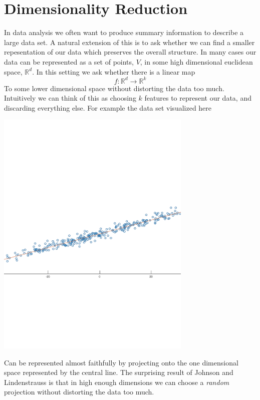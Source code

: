 \documentclass[11pt]{article}
\newcommand{\arr}{\rightarrow}
\newcommand{\R}{\mathbb{R}}
\begin{document}
\section{Dimensionality Reduction}
In data analysis we often want to produce summary information to describe a large data set. A natural extension of this is to ask whether we can find a smaller repesentation of our data which preserves the overall structure. In many cases our data can be represented as a set of points, $V$, in some high dimensional euclidean space, $\R^d$. In this setting we ask whether there is a linear map
\[ f : \R^d \arr \R^k \]
To some lower dimensional space without distorting the data too much. Intuitively we can think of this as choosing $k$ features to represent our data, and discarding everything else. For example the data set visualized here

\begin{center}
    \includegraphics[trim=0 240 0 280, clip,width=0.7\textwidth]{2dprimaryaxis.pdf}
\end{center}

Can be represented almost faithfully by projecting onto the one dimensional space represented by the central line. The surprising result of Johnson and Lindenstrauss is that in high enough dimensions we can choose a \textit{random} projection without distorting the data too much.
\end{document}
